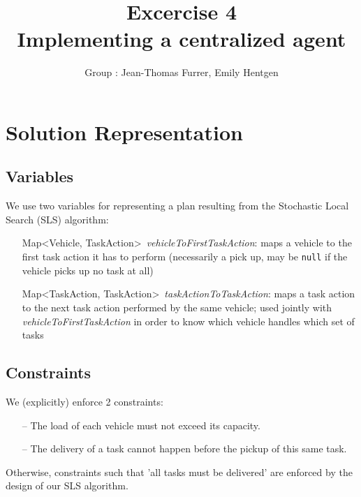 \documentclass[10pt]{article}
\title{\bf Excercise 4\\ Implementing a centralized agent}
\author{Group \textnumero 23: Jean-Thomas Furrer, Emily Hentgen}
\begin{document}
\maketitle

\section{Solution Representation}

\subsection{Variables}
We use two variables for representing a plan resulting from the Stochastic Local Search (SLS) algorithm:
\begin{itemize}
\item[]Map\textless Vehicle, TaskAction\textgreater\ \textit{vehicleToFirstTaskAction}: maps a vehicle to the first task action it has to perform (necessarily a pick up, may be \texttt{null} if the vehicle picks up no task at all)
\item[]Map\textless TaskAction, TaskAction\textgreater\ \textit{taskActionToTaskAction}: maps a task action to the next task action performed by the same vehicle; used jointly with \textit{vehicleToFirstTaskAction} in order to know which vehicle handles which set of tasks
\end{itemize}



\subsection{Constraints}
We (explicitly) enforce 2 constraints:
\begin{itemize}
\itemsep 0mm
\item[--] The load of each vehicle must not exceed its capacity.
\item[--] The delivery of a task cannot happen before the pickup of this same task.
\end{itemize}

Otherwise, constraints such that 'all tasks must be delivered' are enforced by the design of our SLS algorithm.
\end{document}
